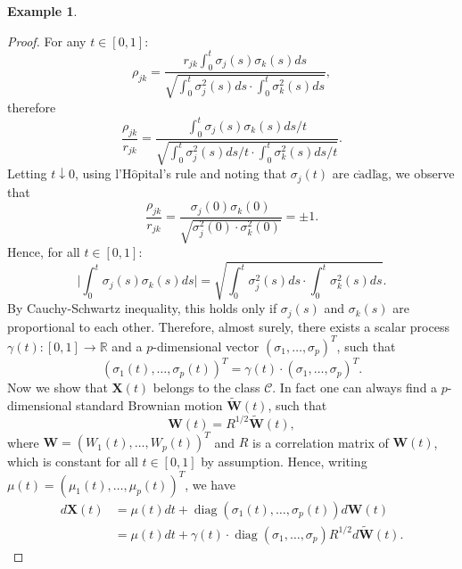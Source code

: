 \documentclass[a4paper,11pt]{book}
\theoremstyle{plain}
\theoremstyle{definition}
\newtheorem{exmp}[thm]{Example}
\newcommand{\MR}{\mathbb{R}}
\newcommand{\diag}{\operatorname{diag}}
\begin{document}
\begin{exmp}
    	\begin{proof}
    		For any $t \in [0, 1]$: 
    		\[ \rho_{jk} = \frac{r_{jk} \int_{0}^{t} \sigma_j(s) \sigma_k(s) ds }{\sqrt{\int_{0}^{t} \sigma_j^2(s) ds \cdot \int_{0}^{t} \sigma_k^2(s) ds}}, \]
    		therefore
    		\[ \frac{\rho_{jk}}{r_{jk}} = \frac{\int_{0}^{t} \sigma_j(s) \sigma_k(s) ds/t }{\sqrt{\int_{0}^{t} \sigma_j^2(s) ds/t \cdot \int_{0}^{t} \sigma_k^2(s) ds/t}}. \]
    		Letting $t \downarrow 0$, using l'H$\hat{\text{o}}$pital's rule and noting that $\sigma_j(t)$ are c$\grave{\text{a}}$dl$\grave{\text{a}}$g, we observe that
    		\[ \frac{\rho_{jk}}{r_{jk}} = \frac{\sigma_j(0) \sigma_k(0)}{ \sqrt{\sigma_j^2(0) \cdot \sigma_k^2(0) }} = \pm 1. \]
    		Hence, for all $t \in [0, 1]$:
    		\[ \bigg| \int_{0}^{t}\sigma_j(s) \sigma_k(s) ds \bigg| = \sqrt{\int_{0}^{t} \sigma_j^2(s) ds \cdot \int_{0}^{t} \sigma_k^2(s) ds} . \]
    		By Cauchy-Schwartz inequality, this holds only if $\sigma_j(s)$ and $\sigma_k(s)$ are proportional to each other. Therefore, almost surely, there exists a scalar process $\gamma(t) : [0, 1] \rightarrow \MR$ and a $p$-dimensional vector $(\sigma_1, \dots, \sigma_p)^T$, such that
    		\[ (\sigma_1(t), \dots, \sigma_p(t))^T = \gamma(t) \cdot (\sigma_1, \dots, \sigma_p)^T. \]
    		Now we show that $\mathbf{X}(t)$ belongs to the class $\mathcal{C}$. In fact one can always find a $p$-dimensional standard Brownian motion $\widetilde{\mathbf{W}}(t)$, such that 
    		\[ \mathbf{W}(t) = R^{1/2}\widetilde{\mathbf{W}}(t), \]
    		where $\mathbf{W} = (W_1(t), \dots, W_p(t))^T$ and $R$ is a correlation matrix of $\mathbf{W}(t)$, which is constant for all $t \in [0, 1]$ by assumption. Hence, writing $\mu(t) = (\mu_1(t), \dots, \mu_p(t))^T$, we have
    		\[ 
    		\begin{aligned}
    		d\mathbf{X}(t) & = \mu(t) dt + \diag(\sigma_1(t), \dots, \sigma_p(t)) d\mathbf{W}(t) \\
    		&  = \mu(t) dt +\gamma(t) \cdot \diag(\sigma_1, \dots, \sigma_p) R^{1/2} d\widetilde{\mathbf{W}}(t).
    		\end{aligned} \]
    	\end{proof}
    \end{exmp}
    
\end{document}
